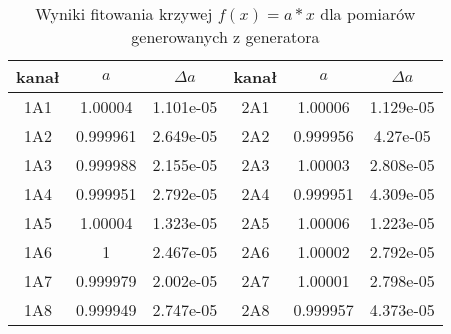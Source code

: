 \begin{table}
        \centering
        \caption{Wyniki fitowania krzywej $f(x) = a*x$ dla pomiarów generowanych z generatora}
        \label{multi fit}
        \begin{tabular}{|c|c|c||c|c|c|}
                \hline
                kanał & $a$ & $\Delta a$  &kanał & $a$ & $\Delta a$ \\ \hline
                1A1 & 1.00004 & 1.101e-05 & 2A1 &1.00006&1.129e-05 \\ \hline
                1A2 & 0.999961 &2.649e-05& 2A2 &0.999956&4.27e-05 \\ \hline
                1A3 & 0.999988&2.155e-05&2A3 & 1.00003&2.808e-05\\ \hline
                1A4 & 0.999951&2.792e-05&2A4&0.999951&4.309e-05\\ \hline
                1A5&1.00004&1.323e-05&2A5&1.00006&1.223e-05\\ \hline
                1A6&1&2.467e-05&2A6&1.00002&2.792e-05 \\ \hline
                1A7&0.999979&2.002e-05&2A7&1.00001&2.798e-05 \\ \hline
                1A8 &0.999949&2.747e-05&2A8&0.999957&4.373e-05 \\ \hline
        \end{tabular}
\end{table}

